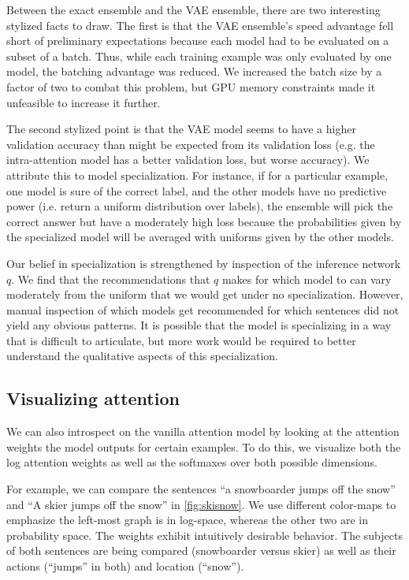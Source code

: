 \documentclass[12pt]{article}
\begin{document}
Between the exact ensemble and the VAE ensemble, there are two interesting
stylized facts to draw. The first is that the VAE ensemble's speed advantage
fell short of preliminary expectations because each model had to be evaluated on
a subset of a batch. Thus, while each training example was only evaluated by one
model, the batching advantage was reduced. We increased the batch size by a
factor of two to combat this problem, but GPU memory constraints made it
unfeasible to increase it further.

The second stylized point is that the VAE model seems to have a higher
validation accuracy than might be expected from its validation loss (e.g. the
intra-attention model has a better validation loss, but worse accuracy). We
attribute this to model specialization. For instance, if for a particular
example, one model is sure of the correct label, and the other models have no
predictive power (i.e. return a uniform distribution over labels), the ensemble
will pick the correct answer but have a moderately high loss because the
probabilities given by the specialized model will be averaged with uniforms
given by the other models. 

Our belief in specialization is strengthened by inspection of the inference
network $q$. We find that the recommendations that $q$ makes for which model to
can vary moderately from the uniform that we would get under no specialization.
However, manual inspection of which models get recommended for which sentences
did not yield any obvious patterns. It is possible that the model is
specializing in a way that is difficult to articulate, but more work would be
required to better understand the qualitative aspects of this specialization. 



\subsection{Visualizing attention}

We can also introspect on the vanilla attention model by looking at the
attention weights the model outputs for certain examples. To do this, we
visualize both the log attention weights as well as the softmaxes over both
possible dimensions.

For example, we can compare the sentences ``a snowboarder jumps off the snow''
and ``A skier jumps off the snow'' in \cref{fig:skisnow}. We use different
color-maps to emphasize the left-most graph is in log-space, whereas the other
two are in probability space. The weights exhibit intuitively desirable
behavior. The subjects of both sentences are being compared (snowboarder versus
skier) as well as their actions (``jumps'' in both) and location (``snow'').
\end{document}
